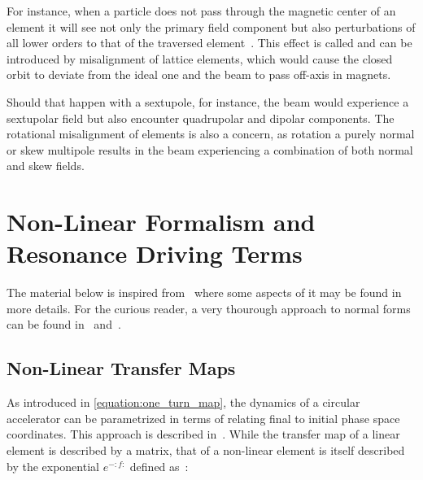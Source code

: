 For instance, when a particle does not pass through the magnetic center of an element it will see not only the primary field component but also perturbations of all lower orders to that of the traversed element~\cite{BOOK:Wiedemann:Particle_Accelerator_Physics}.
This effect is called  and can be introduced by misalignment of lattice elements, which would cause the closed orbit to deviate from the ideal one and the beam to pass off-axis in magnets.

Should that happen with a sextupole, for instance, the beam would experience a sextupolar field but also encounter quadrupolar and dipolar components.
The rotational misalignment of elements is also a concern, as rotation a purely normal or skew multipole results in the beam experiencing a combination of both normal and skew fields.


\section{Non-Linear Formalism and Resonance Driving Terms}
\label{section:non_linear_formalism_and_rdts}

The material below is inspired from~\cite{PHD:Tomas, PHD:Franchi,PHD:Maclean, PHD:Persson} where some aspects of it may be found in more details.
For the curious reader, a very thourough approach to normal forms can be found in~\cite{PHD:Carlier} and~\cite{PRAB:Franchi:First_Simultaneous}.

\subsection{Non-Linear Transfer Maps}
\label{subsection:non_linear_transfer_maps}

As introduced in \cref{equation:one_turn_map}, the dynamics of a circular accelerator can be parametrized in terms of  relating final to initial phase space coordinates.
This approach is described in~\cite{BOOK:Bazzani:Normal_Form_Approach_Betatron_Motion, JMP:Forest:Hamiltonian_Free_Description_Single_Particle_Dynamics}.
While the transfer map of a linear element is described by a matrix, that of a non-linear element is itself described by the exponential  \(e^{-:f:}\) defined as~\cite{BOOK:Wolski:Beam_dynamics}:

